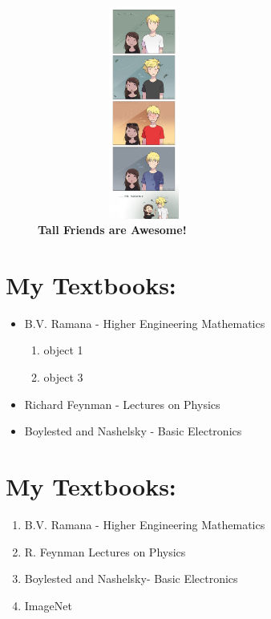 \documentclass[]{article}
\begin{document}
\begin{figure}[h]
\begin{center}
\includegraphics[width=70mm,height=70mm]{tall_fr.jpg} 
\caption{{\bf Tall Friends are Awesome!}}
\label{fig1}
\end{center}

\end{figure}

\section{My Textbooks:}
\begin{itemize}
\item B.V. Ramana - Higher Engineering Mathematics
\begin{enumerate}
    \item object 1
    \item object 3
\end{enumerate}
\item Richard Feynman -  Lectures on Physics
\item Boylested and Nashelsky - Basic Electronics \cite{bohra}
\end{itemize}

\section{My Textbooks:}
\begin{enumerate}
\item B.V. Ramana - Higher Engineering Mathematics
\item R. Feynman Lectures on Physics
\item Boylested and Nashelsky- Basic Electronics
\item ImageNet %
\end{enumerate}



\end{document}
